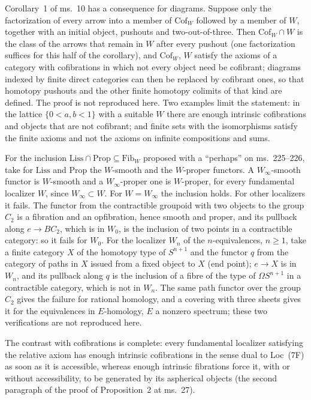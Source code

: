 Corollary~1 of ms.~10 has a consequence for diagrams. Suppose only the factorization of every arrow into a member of $\mathrm{Cof}_W$ followed by a member of $W$, together with an initial object, pushouts and two-out-of-three. Then $\mathrm{Cof}_W\cap W$ is the class of the arrows that remain in $W$ after every pushout (one factorization suffices for this half of the corollary), and $\mathrm{Cof}_W$, $W$ satisfy the axioms of a category with cofibrations in which not every object need be cofibrant; diagrams indexed by finite direct categories can then be replaced by cofibrant ones, so that homotopy pushouts and the other finite homotopy colimits of that kind are defined. The proof is not reproduced here. Two examples limit the statement: in the lattice $\{0<a,b<1\}$ with a suitable $W$ there are enough intrinsic cofibrations and objects that are not cofibrant; and finite sets with the isomorphisms satisfy the finite axioms and not the axioms on infinite compositions and sums.

For the inclusion $\mathrm{Liss}\cap\mathrm{Prop}\subseteq\mathrm{Fib}_W$ proposed with a ``perhaps'' on ms.~225--226, take for $\mathrm{Liss}$ and $\mathrm{Prop}$ the $W$-smooth and the $W$-proper functors. A $W_\infty$-smooth functor is $W$-smooth and a $W_\infty$-proper one is $W$-proper, for every fundamental localizer $W$, since $W_\infty\subset W$. For $W=W_\infty$ the inclusion holds. For other localizers it fails. The functor from the contractible groupoid with two objects to the group $C_2$ is a fibration and an opfibration, hence smooth and proper, and its pullback along $e\to BC_2$, which is in $W_0$, is the inclusion of two points in a contractible category: so it fails for $W_0$. For the localizer $W_n$ of the $n$-equivalences, $n\geq1$, take a finite category $X$ of the homotopy type of $S^{n+1}$ and the functor $q$ from the category of paths in $X$ issued from a fixed object to $X$ (end point); $e\to X$ is in $W_n$, and its pullback along $q$ is the inclusion of a fibre of the type of $\Omega S^{n+1}$ in a contractible category, which is not in $W_n$. The same path functor over the group $C_2$ gives the failure for rational homology, and a covering with three sheets gives it for the equivalences in $E$-homology, $E$ a nonzero spectrum; these two verifications are not reproduced here.

The contrast with cofibrations is complete: every fundamental localizer satisfying the relative axiom has enough intrinsic cofibrations in the sense dual to Loc~(7F) as soon as it is accessible, whereas enough intrinsic fibrations force it, with or without accessibility, to be generated by its aspherical objects (the second paragraph of the proof of Proposition~2 at ms.~27).

